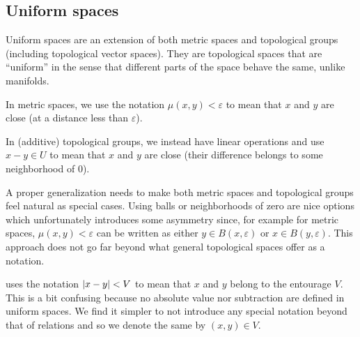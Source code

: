\subsection{Uniform spaces}\label{subsec:uniform_spaces}

\begin{remark}\label{remark:entourage_notation}
  Uniform spaces are an extension of both metric spaces and topological groups (including topological vector spaces). They are topological spaces that are \enquote{uniform} in the sense that different parts of the space behave the same, unlike manifolds.

  In metric spaces, we use the notation \( \mu(x, y) < \varepsilon \) to mean that \( x \) and \( y \) are close (at a distance less than \( \varepsilon \)).

  In (additive) topological groups, we instead have linear operations and use \( x - y \in U \) to mean that \( x \) and \( y \) are close (their difference belongs to some neighborhood of \( 0 \)).

  A proper generalization needs to make both metric spaces and topological groups feel natural as special cases. Using balls or neighborhoods of zero are nice options which unfortunately introduces some asymmetry since, for example for metric spaces, \( \mu(x, y) < \varepsilon \) can be written as either \( y \in B(x, \varepsilon) \) or \( x \in B(y, \varepsilon) \). This approach does not go far beyond what general topological spaces offer as a notation.

  \cite[section 8]{Engelking1989} uses the notation \( \left\vert x - y \right\vert < V \) to mean that \( x \) and \( y \) belong to the entourage \( V \). This is a bit confusing because no absolute value nor subtraction are defined in uniform spaces. We find it simpler to not introduce any special notation beyond that of relations and so we denote the same by \( (x, y) \in V \).
\end{remark}

